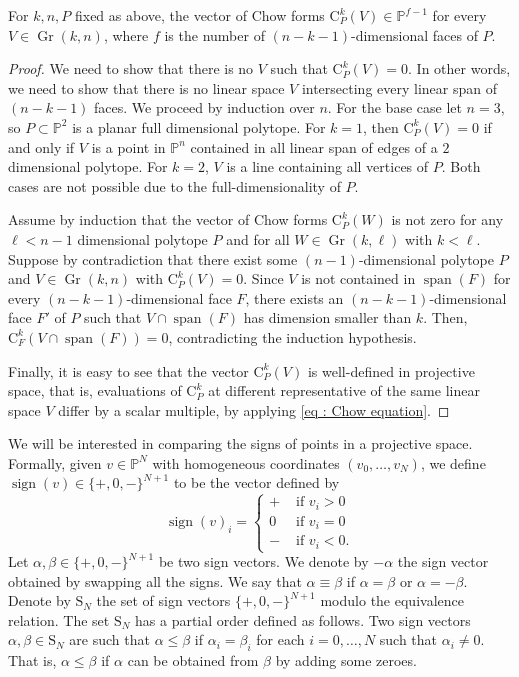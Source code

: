 \documentclass[english]{ourlematema}
\DeclareMathOperator{\Gr}{Gr}
\DeclareMathOperator{\spanv}{span}
\DeclareMathOperator{\sign}{sign}
\newcommand{\PP}{\mathbb{P}}
\newcommand{\CPk}{\mathrm{C}_P^k}
\begin{document}
\begin{lemma}\label{lemma : nonzero}
    For $k,n,P$ fixed as above, the vector of Chow forms $\CPk(V) \in \PP^{f-1}$ for every $V\in \Gr(k,n)$, where $f$ is the number of $(n-k-1)$-dimensional faces of $P$.
\end{lemma}
\begin{proof}
We need to show that there is no $V$ such that $\CPk(V) = 0.$ In other words, we need to show that there is no linear space $V$ intersecting every linear span of $(n-k-1)$ faces.
We proceed by induction over $n$. For the base case let $n=3$, so $P \subset \PP^2$ is a planar full dimensional polytope. 
For $k=1$, then $\CPk(V) = 0$ if and only if $V$ is a point in $\PP^n$ contained in all linear span of edges of a $2$ dimensional polytope. 
For $k=2$, $V$ is a line containing all vertices of $P$. Both cases are not possible due to the full-dimensionality of $P$.

Assume by induction that the vector of Chow forms $\CPk(W)$ is not zero for any $\ell<n-1$ dimensional polytope $P$ and for all $W\in \Gr(k,\ell)$ with $k<\ell$.
Suppose by contradiction that there exist some $(n-1)$-dimensional polytope $P$ and $V\in \Gr(k,n)$ with $\CPk(V) = 0$. Since $V$ is not contained in $\spanv(F)$ for every $(n-k-1)$-dimensional face $F$, there exists an $(n-k-1)$-dimensional face $F'$ of $P$ such that $V\cap \spanv (F)$ has dimension smaller than $k$. Then, $\mathrm{C}_{F}^k(V\cap {\spanv}(F))=0$, contradicting the induction hypothesis.

Finally, it is easy to see that the vector $\CPk(V)$ is well-defined in projective space, that is, evaluations of $\CPk$ at different representative of the same linear space $V$ differ by a scalar multiple, by applying \cref{eq : Chow equation}.
\end{proof}

We will be interested in comparing the signs of points in a projective space. Formally, given $v\in \PP^N$ with homogeneous coordinates $(v_0, \ldots, v_N)$, we define $\sign(v) \in \{ +,0,- \}^{N+1}$ to be the vector defined by
\[ \sign(v)_i = \begin{cases}
    + & \text{ if } v_i>0\\
    0 & \text{ if } v_i=0\\
    - & \text{ if } v_i<0.
\end{cases} \]
Let $\alpha,\beta \in \{ +,0,- \}^{N+1}$ be two sign vectors. We denote by $-\alpha$ the sign vector obtained by swapping all the signs. We say that $\alpha \equiv \beta$ if $\alpha = \beta$ or $\alpha = -\beta$. Denote by $\mathrm{S}_N$ the set of sign vectors $\{ +,0,- \}^{N+1}$ modulo the equivalence relation.
The set $\mathrm{S}_N$ has a partial order defined as follows. Two sign vectors $\alpha, \beta \in \mathrm{S}_N$ are such that $\alpha \leq \beta$ if $\alpha_i=\beta_i$ for each $i=0,\ldots,N$ such that $\alpha_i\neq 0$. That is, $\alpha \leq \beta$ if $\alpha$ can be obtained from $\beta$ by adding some zeroes.
\end{document}
